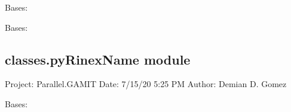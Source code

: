 \documentclass[letterpaper,10pt,english]{sphinxmanual}
\begin{document}

\begin{fulllineitems}
\label{\detokenize{classes:classes.pyRinex.pyRinexExceptionNoAutoCoord}}
\pysigstartsignatures
{}
\pysigstopsignatures
\sphinxAtStartPar
Bases: {\hyperref[\detokenize{classes:classes.pyRinex.pyRinexException}]{}}

\end{fulllineitems}


\begin{fulllineitems}
\label{\detokenize{classes:classes.pyRinex.pyRinexExceptionSingleEpoch}}
\pysigstartsignatures
{}
\pysigstopsignatures
\sphinxAtStartPar
Bases: {\hyperref[\detokenize{classes:classes.pyRinex.pyRinexException}]{}}

\end{fulllineitems}



\subsection{classes.pyRinexName module}
\label{\detokenize{classes:module-classes.pyRinexName}}\label{\detokenize{classes:classes-pyrinexname-module}}
\sphinxAtStartPar
Project: Parallel.GAMIT
Date: 7/15/20 5:25 PM
Author: Demian D. Gomez

\begin{fulllineitems}
\label{\detokenize{classes:classes.pyRinexName.RinexNameException}}
\pysigstartsignatures
{}
\pysigstopsignatures
\sphinxAtStartPar
Bases: 

\end{fulllineitems}
\end{document}
